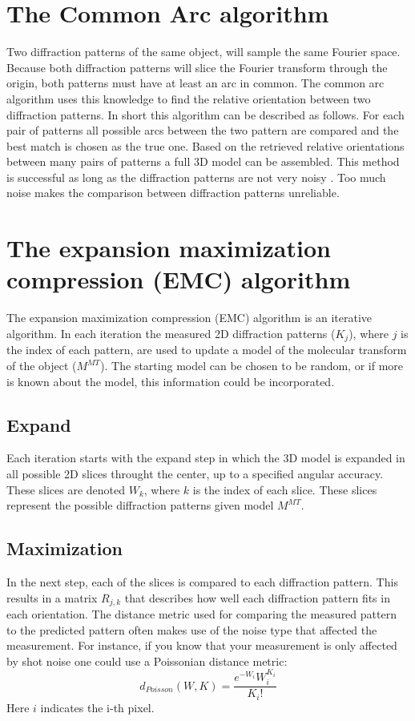 \section{The Common Arc algorithm}

Two diffraction patterns of the same object, will sample the same Fourier space. Because both diffraction patterns will slice the Fourier transform through the origin, both patterns must have at least an arc in common. The common arc algorithm uses this knowledge to find the relative orientation between two diffraction patterns. In short this algorithm can be described as follows. For each pair of patterns all possible arcs between the two pattern are compared and the best match is chosen as the true one. Based on the retrieved relative orientations between many pairs of patterns a full 3D model can be assembled. This method is successful as long as the diffraction patterns are not very noisy \cite{Tegze2012}. Too much noise makes the comparison between diffraction patterns unreliable.

\section{The expansion maximization compression (EMC) algorithm}
The expansion maximization compression (EMC) algorithm is an iterative algorithm. In each iteration the measured 2D diffraction patterns ($K_j$), where $j$ is the index of each pattern, are used to update a model of the molecular transform of the object ($M^{MT}$). The starting model can be chosen to be random, or if more is known about the model, this information could be incorporated. 

\subsection{Expand} 

Each iteration starts with the expand step in which the 3D model is expanded in all possible 2D slices throught the center, up to a specified angular accuracy. These slices are denoted $W_k$, where $k$ is the index of each slice. These slices represent the possible diffraction patterns given model $M^{MT}$. 

\subsection{Maximization} 

In the next step, each of the slices is compared to each diffraction pattern. This results in a matrix $R_{j,k}$ that describes how well each diffraction pattern fits in each orientation. The distance metric used for comparing the measured pattern to the predicted pattern often makes use of the noise type that affected the measurement. For instance, if you know that your measurement is only affected by shot noise one could use a Poissonian distance metric:
\begin{equation}
d_{Poisson}(W,K) = \frac{e^{-W_i}W_i^{K_i}}{K_i !}
\end{equation}
Here $i$ indicates the i-th pixel.

